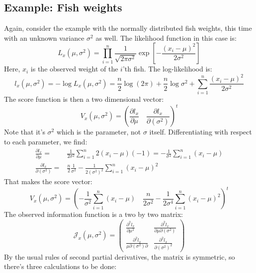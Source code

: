 \documentclass[12pt, a4paper]{article}
\numberwithin{equation}{section}
\begin{document}
\subsection{Example: Fish weights}
Again, consider the example with the normally distributed fish weights, this time with an unknown variance $\sigma^2$ as well. The likelihood function in this case is:
\begin{equation}
L_x(\mu,\sigma^2)=\prod_{i=1}^n\frac{1}{\sqrt{2\pi\sigma^2}}\exp\left[-\frac{(x_i-\mu)^2}{2\sigma^2}\right]
\end{equation}
Here, $x_i$ is the observed weight of the $i$'th fish. The log-likelihood is:
\begin{equation}
l_x(\mu,\sigma^2)=-\log L_x(\mu,\sigma^2)=\frac{n}{2}\log(2\pi)+\frac{n}{2}\log\sigma^2+\sum_{i=1}^n\frac{(x_i-\mu)^2}{2\sigma^2}
\end{equation}
The score function is then a two dimensional vector:
\begin{equation}
V_x(\mu,\sigma^2)=\left(\frac{\partial l_x}{\partial\mu}\quad\frac{\partial l_x}{\partial(\sigma^2)}\right)^t
\end{equation}
Note that it's $\sigma^2$ which is the parameter, not $\sigma$ itself. Differentiating with respect to each parameter, we find:
\begin{align}
\frac{\partial l_x}{\partial\mu}=&\frac{1}{2\sigma^2}\sum_{i=1}^n 2(x_i-\mu)(-1)=-\frac{1}{\sigma^2}\sum_{i=1}^n(x_i-\mu)\\
\frac{\partial l_x}{\partial(\sigma^2)}=&\frac{n}{2}\frac{1}{\sigma^2}-\frac{1}{2(\sigma^2)^2}\sum_{i=1}^n(x_i-\mu)^2
\end{align}
That makes the score vector:
\begin{equation}
V_x(\mu,\sigma^2)=\left(-\frac{1}{\sigma^2}\sum_{i=1}^n(x_i-\mu)\quad\frac{n}{2\sigma^2}-\frac{1}{2\sigma^4}\sum_{i=1}^n(x_i-\mu)^2\right)^t
\end{equation}
The observed information function is a two by two matrix:
\begin{equation}
\mathcal{J}_x(\mu,\sigma^2)=
\begin{pmatrix}
\frac{\partial^2 l_x}{\partial\mu^2} & \frac{\partial^2 l_x}{\partial\mu\partial(\sigma^2)} \\
\frac{\partial^2 l_x}{\mu\partial(\sigma^2)\partial} & \frac{\partial^2 l_x}{\partial(\sigma^2)^2}
\end{pmatrix}
\end{equation}
By the usual rules of second partial derivatives, the matrix is symmetric, so there's three calculations to be done:
\end{document}
